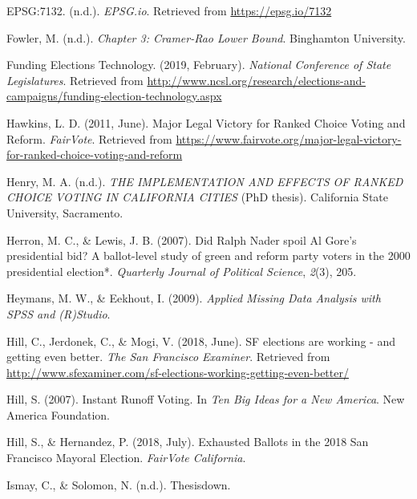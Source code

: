 \documentclass[12pt,twoside]{reedthesis}
\begin{document}
\leavevmode\hypertarget{ref-noauthor_epsg7132_nodate}{}%
EPSG:7132. (n.d.). \emph{EPSG.io}. Retrieved from \url{https://epsg.io/7132}

\leavevmode\hypertarget{ref-fowler_chapter_2018}{}%
Fowler, M. (n.d.). \emph{Chapter 3: Cramer-Rao Lower Bound}. Binghamton University.

\leavevmode\hypertarget{ref-noauthor_funding_2019}{}%
Funding Elections Technology. (2019, February). \emph{National Conference of State Legislatures}. Retrieved from \url{http://www.ncsl.org/research/elections-and-campaigns/funding-election-technology.aspx}

\leavevmode\hypertarget{ref-hawkins_major_2011}{}%
Hawkins, L. D. (2011, June). Major Legal Victory for Ranked Choice Voting and Reform. \emph{FairVote}. Retrieved from \url{https://www.fairvote.org/major-legal-victory-for-ranked-choice-voting-and-reform}

\leavevmode\hypertarget{ref-henry_implementation_2016}{}%
Henry, M. A. (n.d.). \emph{THE IMPLEMENTATION AND EFFECTS OF RANKED CHOICE VOTING IN CALIFORNIA CITIES} (PhD thesis). California State University, Sacramento.

\leavevmode\hypertarget{ref-herron_did_2007}{}%
Herron, M. C., \& Lewis, J. B. (2007). Did Ralph Nader spoil Al Gore's presidential bid? A ballot-level study of green and reform party voters in the 2000 presidential election*. \emph{Quarterly Journal of Political Science}, \emph{2}(3), 205.

\leavevmode\hypertarget{ref-heymans_applied_2009}{}%
Heymans, M. W., \& Eekhout, I. (2009). \emph{Applied Missing Data Analysis with SPSS and (R)Studio}.

\leavevmode\hypertarget{ref-hill_sf_2018}{}%
Hill, C., Jerdonek, C., \& Mogi, V. (2018, June). SF elections are working - and getting even better. \emph{The San Francisco Examiner}. Retrieved from \url{http://www.sfexaminer.com/sf-elections-working-getting-even-better/}

\leavevmode\hypertarget{ref-hill_instant_2007}{}%
Hill, S. (2007). Instant Runoff Voting. In \emph{Ten Big Ideas for a New America}. New America Foundation.

\leavevmode\hypertarget{ref-hill_exhausted_2018}{}%
Hill, S., \& Hernandez, P. (2018, July). Exhausted Ballots in the 2018 San Francisco Mayoral Election. \emph{FairVote California}.

\leavevmode\hypertarget{ref-ismay_thesisdown_nodate}{}%
Ismay, C., \& Solomon, N. (n.d.). Thesisdown.
\end{document}
